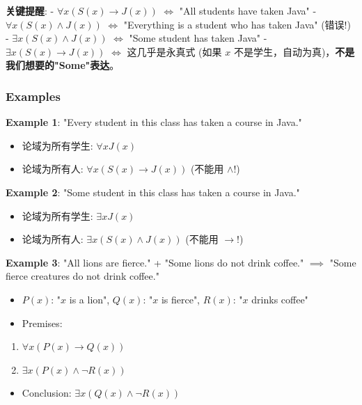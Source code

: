 \documentclass[10pt,a4paper,openany]{ctexbook}
\theoremstyle{definition}
\theoremstyle{remark}
\renewenvironment{quote}
  {\list{}{\leftmargin=1em\rightmargin=0pt\topsep=0.5pt\partopsep=0pt}\item[]}
  {\endlist}
\begin{document}
\begin{quote}
\textbf{关键提醒}:
- $\forall x (S(x) \to J(x))$ $\iff$ "All students have taken Java"
- $\forall x (S(x) \land J(x))$ $\iff$ "Everything is a student who has taken Java" (错误!)
- $\exists x (S(x) \land J(x))$ $\iff$ "Some student has taken Java"
- $\exists x (S(x) \to J(x))$ $\iff$ 这几乎是永真式 (如果 $x$ 不是学生，自动为真)，\textbf{不是我们想要的"Some"表达}。

\end{quote}

\subsubsection{Examples}

\textbf{Example 1}: "Every student in this class has taken a course in Java."
\begin{itemize}
\item 论域为所有学生: $\forall x J(x)$
\item 论域为所有人: $\forall x (S(x) \to J(x))$ (不能用 $\land$!)

\end{itemize}

\textbf{Example 2}: "Some student in this class has taken a course in Java."
\begin{itemize}
\item 论域为所有学生: $\exists x J(x)$
\item 论域为所有人: $\exists x (S(x) \land J(x))$ (不能用 $\to$!)

\end{itemize}

\textbf{Example 3}: "All lions are fierce." + "Some lions do not drink coffee." $\implies$ "Some fierce creatures do not drink coffee."
\begin{itemize}
\item $P(x)$: "$x$ is a lion", $Q(x)$: "$x$ is fierce", $R(x)$: "$x$ drinks coffee"
\item Premises:
\end{itemize}

\begin{enumerate}
\item $\forall x (P(x) \to Q(x))$
\item $\exists x (P(x) \land \neg R(x))$
\end{enumerate}

\begin{itemize}
\item Conclusion: $\exists x (Q(x) \land \neg R(x))$

\end{itemize}
\end{document}
